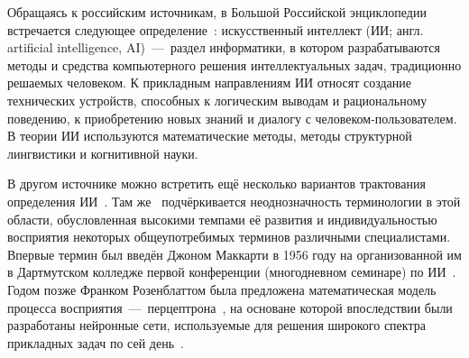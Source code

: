 Обращаясь к российским источникам, в Большой Российской энциклопедии встречается следующее определение~\cite{osipov}: искусственный интеллект (ИИ; англ. artificial intelligence, AI)~---~раздел информатики, в котором разрабатываются методы и средства компьютерного решения интеллектуальных задач, традиционно решаемых человеком. К прикладным направлениям ИИ относят создание технических устройств, способных к логическим выводам и рациональному поведению, к приобретению новых знаний и диалогу с человеком-пользователем. В теории ИИ используются математические методы, методы структурной лингвистики и когнитивной науки. 

В другом источнике можно встретить ещё несколько вариантов трактования определения ИИ~\cite[с.~247]{averkin}. Там же~\cite[с.~245]{averkin} подчёркивается неоднозначность терминологии в этой области, обусловленная высокими темпами её развития и индивидуальностью восприятия некоторых общеупотребимых терминов различными специалистами. Впервые термин был введён Джоном Маккарти в 1956 году на организованной им в Дартмутском колледже первой конференции (многодневном семинаре) по ИИ~\cite{osipov}. Годом позже Франком Розенблаттом была предложена математическая модель процесса восприятия~---~перцептрона~\cite{rosenblatt}, на основане которой впоследствии были разработаны нейронные сети, используемые для решения широкого спектра прикладных задач по сей день~\cite{skansi, nikolenko, trask, goodfellow, sharifani, sarkerdl, hoffer, zeiler}. 

